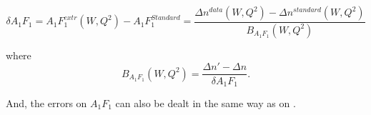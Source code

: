 \begin{equation}
\label{a1f1Ext}
\delta A_{1}F_{1} = A_{1}F_{1}^{extr}(W,Q^2) - A_{1}F_{1}^{Standard} = \frac{\Delta n^{data}(W,Q^2) - \Delta n^{standard}(W,Q^2)}{B_{A_1F_1}(W,Q^2) }
\end{equation}

where
\begin{equation}
\label{propFac}
B_{A_1F_1}(W,Q^2)  = \frac{\Delta n' - \Delta n}{\delta A_1F_1}.
\end{equation}

And, the errors on $A_1F_1$ can also be dealt in the same way as on \gone.












